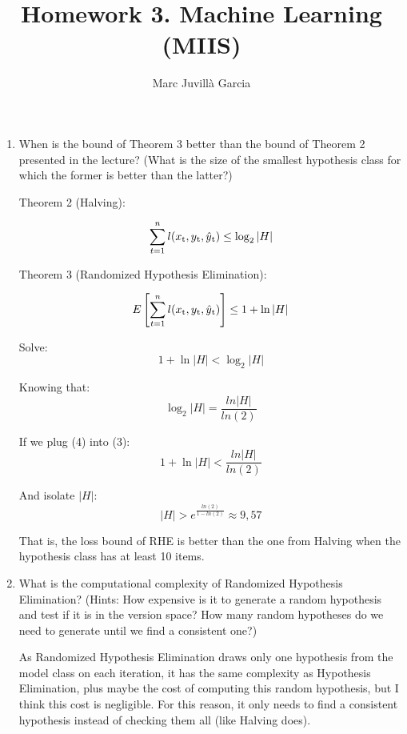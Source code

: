 \documentclass{article}
\author{Marc Juvillà Garcia}
\title{\vspace{-2cm}Homework 3. Machine Learning (MIIS)}
\begin{document}
\maketitle

\begin{enumerate}
\item When is the bound of Theorem 3 better than the bound of Theorem 2 presented in the lecture? (What is the size of the smallest hypothesis class for which the former is better than the latter?)

Theorem 2 (Halving): 

\begin{equation}
\sum_{t=1}^{n} l(x\textsubscript{t}, y\textsubscript{t}, \hat{y}\textsubscript{t}) \leq \log_2|H|
\end{equation}

Theorem 3 (Randomized Hypothesis Elimination): 

\begin{equation}
E\left[\sum_{t=1}^{n} l(x\textsubscript{t}, y\textsubscript{t}, \hat{y}\textsubscript{t})\right] \leq 1 + \ln|H|
\end{equation}

Solve:
\begin{equation}
1 + \ln|H| < \log_2|H|
\end{equation}

Knowing that:
\begin{equation}
\log_2|H| = \frac{ln|H|}{ln(2)}
\end{equation}

If we plug (4) into (3):
\begin{equation}
1 + \ln|H| < \frac{ln|H|}{ln(2)}
\end{equation}

And isolate $|H|$:
\begin{equation}
|H| > e^{\frac{ln(2)}{1-ln(2)}} \approx 9,57
\end{equation}

That is, the loss bound of RHE is better than the one from Halving when the hypothesis class has at least 10 items.

\item What is the computational complexity of Randomized Hypothesis Elimination? (Hints: How expensive is it to generate a random hypothesis and test if it is in the version space? How many random hypotheses do we need to generate until we find a consistent one?)

As Randomized Hypothesis Elimination draws only one hypothesis from the model class on each iteration, it has the same complexity as Hypothesis Elimination, plus maybe the cost of computing this random hypothesis, but I think this cost is negligible. For this reason, it only needs to find a consistent hypothesis instead of checking them all (like Halving does).


\end{enumerate}
\end{document}
